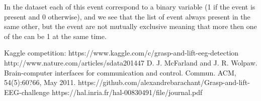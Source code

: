 \documentclass[final,leqno,onefignum,onetabnum]{siamltexmm}
\begin{document}
In the dataset each of this event correspond to a binary variable (1 if the event is present and 0 otherwise), and we see that the list of event always present in the same other, but the event are not mutually exclusive meaning that more then one of the can be 1 at the same time.\\
 






\begin{thebibliography}{1}
 Kaggle competition:  https://www.kaggle.com/c/grasp-and-lift-eeg-detection
 http://www.nature.com/articles/sdata201447
D. J. McFarland and J. R. Wolpaw. Brain-computer interfaces for communication and control.
Commun. ACM, 54(5):60?66, May 2011.
https://github.com/alexandrebarachant/Grasp-and-lift-EEG-challenge
https://hal.inria.fr/hal-00830491/file/journal.pdf

\end{thebibliography} 
\end{document}
